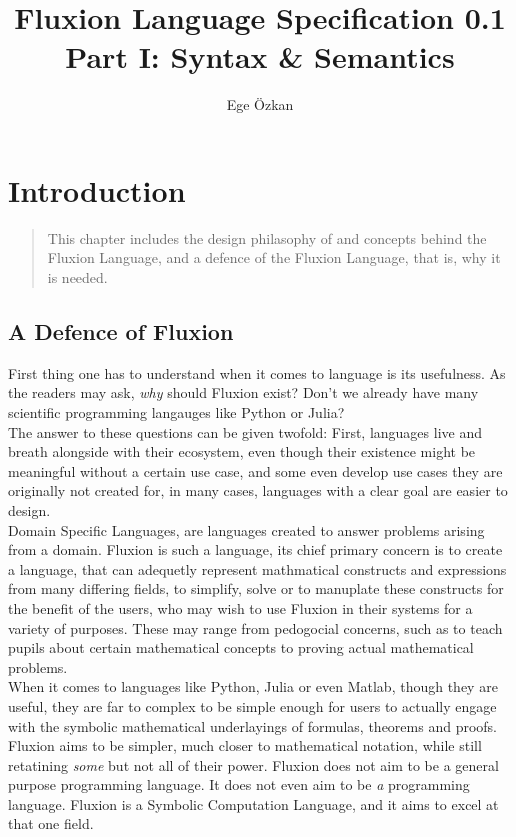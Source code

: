 \documentclass[11pt,a4paper]{book}
\author{Ege Özkan}
\title{Fluxion Language Specification 0.1 \\ \large{Part I: Syntax \& Semantics}}
\begin{document}
\maketitle

\tableofcontents
\newpage

\chapter{Introduction}
\vspace{1em}
\begin{quotation}
This chapter includes the design philasophy of and concepts behind the Fluxion Language, and a defence of the Fluxion Language, that is, why it is needed.
\end{quotation}

\newpage
\section{A Defence of Fluxion}

First thing one has to understand when it comes to language is its usefulness. As the readers may ask, \textit{why} should Fluxion exist? Don't we already have many scientific programming langauges like Python or Julia?\\

The answer to these questions can be given twofold: First, languages live and breath alongside with their ecosystem, even though their existence might be meaningful without a certain use case, and some even develop use cases they are originally not created for, in many cases, languages with a clear goal are easier to design.\\

Domain Specific Languages, are languages created to answer problems arising from a domain. Fluxion is such a language, its chief primary concern is to create a language, that can adequetly represent mathmatical constructs and expressions from many differing fields, to simplify, solve or to manuplate these constructs for the benefit of the users, who may wish to use Fluxion in their systems for a variety of purposes. These may range from pedogocial concerns, such as to teach pupils about certain mathematical concepts to proving actual mathematical problems.\\

When it comes to languages like Python, Julia or even Matlab, though they are useful, they are far to complex to be simple enough for users to actually engage with the symbolic mathematical underlayings of formulas, theorems and proofs. Fluxion aims to be simpler, much closer to mathematical notation, while still retatining \textit{some} but not all of their power. Fluxion does not aim to be a general purpose programming language. It does not even aim to be \textit{a} programming language. Fluxion is a Symbolic Computation Language, and it aims to excel at that one field.\\
\end{document}
